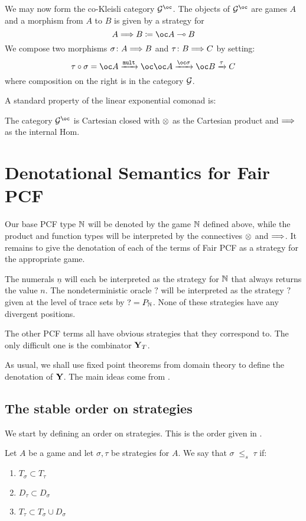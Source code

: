 \documentclass{article}
\newcommand{\stle}{{\;\le_s\;}}
\begin{document}
We may now form the co-Kleisli category $\G^{\oc}$.  The objects of $\G^{\oc}$ are games $A$ and a morphism from $A$ to $B$ is given by a strategy for
\[
  A \iimpl B \coloneqq \oc A \implies B
  \]
We compose two morphisms $\sigma\colon A\Longrightarrow B$ and $\tau\colon B\Longrightarrow C$ by setting:
\[
  \icomp{\tau}{\sigma} = \oc A \xrightarrow{\mult} \oc \oc A \xrightarrow{\oc \sigma} \oc B \xrightarrow{\tau} C
  \]
where composition on the right is in the category $\mathcal G$.

A standard property of the linear exponential comonad is:

\begin{theorem}
  The category $\G^{\oc}$ is Cartesian closed with $\otimes$ as the Cartesian product and $\Longrightarrow$ as the internal Hom.
\end{theorem}

\section{Denotational Semantics for Fair PCF}

Our base PCF type $\mathbb{N}$ will be denoted by the game $\mathbb{N}$ defined above, while the product and function types will be interpreted by the connectives $\otimes$ and $\Longrightarrow$.  It remains to give the denotation of each of the terms of Fair PCF as a strategy for the appropriate game.

The numerals $\underline{n}$ will each be interpreted as the strategy for $\mathbb{N}$ that always returns the value $n$.  The nondeterministic oracle $?$ will be interpreted as the strategy $?$ given at the level of trace sets by $?=P_{\mathbb{N}}$.  None of these strategies have any divergent positions.

The other PCF terms all have obvious strategies that they correspond to.  The only difficult one is the combinator $\mathbf{Y}_T$.  

As usual, we shall use fixed point theorems from domain theory to define the denotation of $\mathbf{Y}$.  The main ideas come from \cite{LairdOrdinalGames}.

\subsection{The stable order on strategies}

We start by defining an order on strategies.  This is the order given in \cite{mcCHFiniteND}.

\begin{definition}
  Let $A$ be a game and let $\sigma,\tau$ be strategies for $A$.  We say that $\sigma\stle\tau$ if:

  \begin{enumerate}[1)]
    \item $T_\sigma\subset T_\tau$
    \item $D_\tau\subset D_\sigma$
    \item $T_\tau\subset T_\sigma \cup D_\sigma$
  \end{enumerate}
\end{definition}
\end{document}

